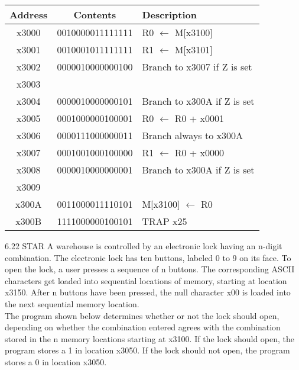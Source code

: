 \documentclass{patt}
\begin{document}
\begin{exercises}
\begin{tabular}[t]{|c|c|l|}
\hline
Address & Contents & Description \\
\hline
x3000 & 0010000011111111 & R0 $\leftarrow$ M[x3100] \\
\hline
x3001 & 0010001011111111 & R1 $\leftarrow$ M[x3101] \\
\hline
x3002 & 0000010000000100 & Branch to x3007 if Z is set  \\
\hline
x3003 &                  &  \\
\hline
x3004 & 0000010000000101 & Branch to x300A if Z is set  \\
\hline
x3005 & 0001000000100001 & R0 $\leftarrow$ R0 + x0001 \\
\hline
x3006 & 0000111000000011 & Branch always to x300A \\
\hline
x3007 & 0001001000100000 & R1 $\leftarrow$ R0 + x0000 \\
\hline
x3008 & 0000010000000001 & Branch to x300A if Z is set  \\
\hline
x3009 &                  &  \\
\hline
x300A & 0011000011110101 & M[x3100] $\leftarrow$ R0 \\
\hline
x300B & 1111000000100101 & TRAP x25 \\
\hline
\end{tabular}

\vspace{0.35in}

\item[6.22]STAR A warehouse is controlled by an electronic lock having
an n-digit combination.  The electronic lock has ten buttons, labeled 0 to 9
on its face.  To open the lock, a user presses a sequence of n buttons. The corresponding
ASCII characters get loaded into sequential locations of memory, starting at location x3150.  After
n buttons have been pressed, the null character x00 is loaded into the next
sequential memory location. \\

\noindent
The program shown below determines whether or not the lock should open,
depending on whether the combination entered agrees with the combination
stored in the n memory locations starting at x3100.  If the lock should
open, the program stores a 1 in location x3050.  If the lock should not
open, the program stores a 0 in location x3050. \\


\end{exercises}
\end{document}
